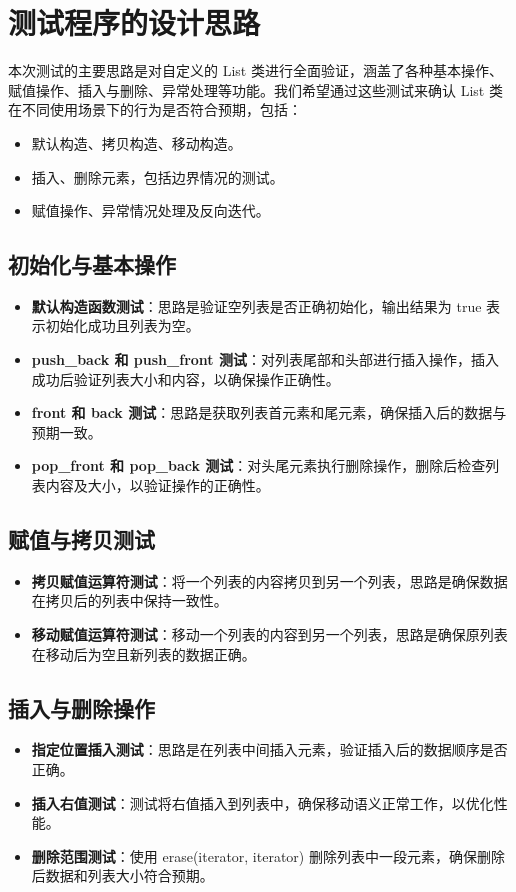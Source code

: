 \documentclass[UTF8]{ctexart}
\begin{document}
\pagestyle{fancy}
\fancyhead{}

\section{测试程序的设计思路}

本次测试的主要思路是对自定义的 List 类进行全面验证，涵盖了各种基本操作、赋值操作、插入与删除、异常处理等功能。我们希望通过这些测试来确认 List 类在不同使用场景下的行为是否符合预期，包括：
\begin{itemize}
\item 默认构造、拷贝构造、移动构造。
\item 插入、删除元素，包括边界情况的测试。
\item 赋值操作、异常情况处理及反向迭代。
\end{itemize}


\subsection{初始化与基本操作}
\begin{itemize}
\item \textbf{默认构造函数测试}：思路是验证空列表是否正确初始化，输出结果为 true 表示初始化成功且列表为空。
\item \textbf{push\_back 和 push\_front 测试}：对列表尾部和头部进行插入操作，插入成功后验证列表大小和内容，以确保操作正确性。
\item \textbf{front 和 back 测试}：思路是获取列表首元素和尾元素，确保插入后的数据与预期一致。
\item \textbf{pop\_front 和 pop\_back 测试}：对头尾元素执行删除操作，删除后检查列表内容及大小，以验证操作的正确性。
\end{itemize}

\subsection{赋值与拷贝测试}
\begin{itemize}
\item \textbf{拷贝赋值运算符测试}：将一个列表的内容拷贝到另一个列表，思路是确保数据在拷贝后的列表中保持一致性。
\item \textbf{移动赋值运算符测试}：移动一个列表的内容到另一个列表，思路是确保原列表在移动后为空且新列表的数据正确。
\end{itemize}

\subsection{插入与删除操作}
\begin{itemize}
\item \textbf{指定位置插入测试}：思路是在列表中间插入元素，验证插入后的数据顺序是否正确。
\item \textbf{插入右值测试}：测试将右值插入到列表中，确保移动语义正常工作，以优化性能。
\item \textbf{删除范围测试}：使用 erase(iterator, iterator) 删除列表中一段元素，确保删除后数据和列表大小符合预期。
\end{itemize}
\end{document}
